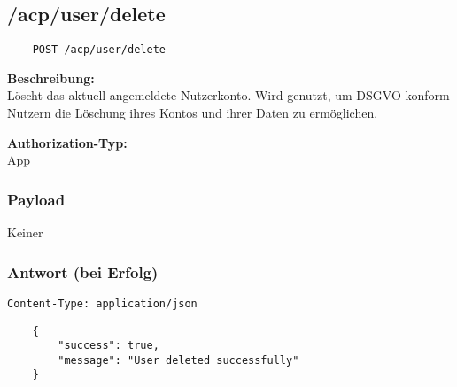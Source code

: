 \subsection{/acp/user/delete}

\begin{lstlisting}
    POST /acp/user/delete
\end{lstlisting}

\textbf{Beschreibung:} \\
Löscht das aktuell angemeldete Nutzerkonto. Wird genutzt, um DSGVO-konform Nutzern die Löschung ihres Kontos und ihrer Daten zu ermöglichen.

\textbf{Authorization-Typ:} \\
App

\subsubsection{Payload}

Keiner

\subsubsection{Antwort (bei Erfolg)}

\lstinline{Content-Type: application/json}
\begin{lstlisting}
    {
        "success": true, 
        "message": "User deleted successfully"
    }
\end{lstlisting}
